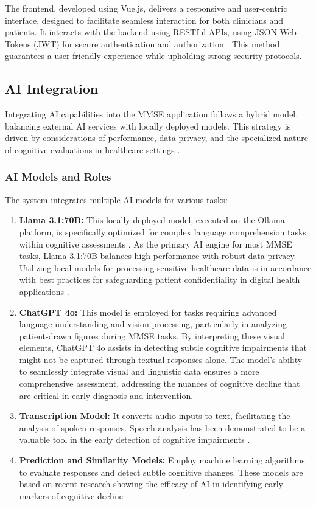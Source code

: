 The frontend, developed using Vue.js, delivers a responsive and user-centric interface, designed to facilitate seamless interaction for both clinicians and patients. It interacts with the backend using RESTful APIs, using JSON Web Tokens (JWT) for secure authentication and authorization \cite{Jones2015}. This method guarantees a user-friendly experience while upholding strong security protocols.

\subsection{AI Integration}
Integrating AI capabilities into the MMSE application follows a hybrid model, balancing external AI services with locally deployed models. This strategy is driven by considerations of performance, data privacy, and the specialized nature of cognitive evaluations in healthcare settings \cite{Bauer2012}.

\subsubsection{AI Models and Roles}
The system integrates multiple AI models for various tasks:
\begin{enumerate}
\item \textbf{Llama 3.1:70B:} This locally deployed model, executed on the Ollama platform, is specifically optimized for complex language comprehension tasks within cognitive assessments \cite{Ollama2024}. As the primary AI engine for most MMSE tasks, Llama 3.1:70B balances high performance with robust data privacy. Utilizing local models for processing sensitive healthcare data is in accordance with best practices for safeguarding patient confidentiality in digital health applications \cite{Krutz2017}.
\item \textbf{ChatGPT 4o:} This model is employed for tasks requiring advanced language understanding and vision processing, particularly in analyzing patient-drawn figures during MMSE tasks. By interpreting these visual elements, ChatGPT 4o assists in detecting subtle cognitive impairments that might not be captured through textual responses alone. The model's ability to seamlessly integrate visual and linguistic data ensures a more comprehensive assessment, addressing the nuances of cognitive decline that are critical in early diagnosis and intervention.
\item \textbf{Transcription Model:} It converts audio inputs to text, facilitating the analysis of spoken responses. Speech analysis has been demonstrated to be a valuable tool in the early detection of cognitive impairments \cite{Konig2015}.
\item \textbf{Prediction and Similarity Models:} Employ machine learning algorithms to evaluate responses and detect subtle cognitive changes. These models are based on recent research showing the efficacy of AI in identifying early markers of cognitive decline \cite{Grassi2019}.
\end{enumerate}

